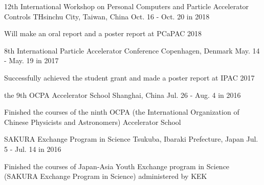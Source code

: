 

\begin{cventries}

  \cventry
    {} %
    {12th International Workshop on Personal Computers and Particle Accelerator Controls} %
    {THsinchu City, Taiwan, China} %
    {Oct. 16 - Oct. 20 in 2018} %
    {
        \begin{cvitems} %
            \item {Will make an oral report and a poster report at PCaPAC 2018}
        \end{cvitems}    
    }

  \cventry
    {} %
    {8th International Particle Accelerator Conference} %
    {Copenhagen, Denmark} %
    {May. 14 - May. 19 in 2017} %
    {
        \begin{cvitems} %
            \item {Successfully achieved the student grant and made a poster report at IPAC 2017}
        \end{cvitems}    
    }

  \cventry
    {} %
    {the 9th OCPA Accelerator School} %
    {Shanghai, China} %
    {Jul. 26 - Aug. 4 in 2016} %
    {
        \begin{cvitems} %
            \item {Finished the courses of the ninth OCPA (the International Organization of Chinese Physicists and Astronomers) Accelerator School }
        \end{cvitems}
    }

  \cventry
    {} %
    {SAKURA Exchange Program in Science} %
    {Tsukuba, Ibaraki Prefecture, Japan} %
    {Jul. 5 - Jul. 14 in 2016} %
    {
        \begin{cvitems} %
            \item {Finished the courses of Japan-Asia Youth Exchange program in Science (SAKURA Exchange Program in Science) administered by KEK}
        \end{cvitems}
    }

\end{cventries}
